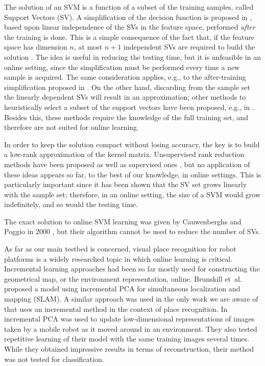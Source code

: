 The solution of an SVM is a function of a subset of the training samples,
called Support Vectors (SV).
A simplification of the decision function is proposed in
\cite{DownsGM01}, based upon linear independence of the SVs in the
feature space, performed \emph{after} the training is done. This is a
simple consequence of the fact that, if the feature space has
dimension $n$, at most $n+1$ independent SVs are required to build the
solution \cite{PontilV98}. The idea is useful in reducing the testing
time, but it is unfeasible in an online setting, since the
simplification must be performed every time a new sample is
acquired. The same consideration applies, e.g., to the after-training
simplification proposed in \cite{nguyen2005}. On the other hand,
discarding from the sample set the linearly dependent SVs will result
in an approximation; other methods to heuristically select a subset of
the support vectors have been proposed, e.g., in
\cite{LeeM01,schoel06,KeerthiCDC06}. Besides this, these methods
require the knowledge of the full training set, and therefore are not
suited for online learning.

In order to keep the solution compact without losing accuracy, the key
is to build a low-rank approximation of the kernel matrix. Unsupervised
rank reduction methods have been proposed
\cite{Baudat03} as well as supervised ones \cite{BachJordan2005}, but
no application of these ideas appears so far, to the best of our
knowledge, in online settings. This is particularly important since it
has been shown \cite{Steinwart03} that the SV set grows linearly with
the sample set; therefore, in an online setting, the size of a SVM
would grow indefinitely, and so would the testing time.

The exact solution to online SVM learning was given by Cauwenberghs
and Poggio in 2000 \cite{CauwenberghsP00}, but their algorithm cannot
be used to reduce the number of SVs.

As far as our main testbed is concerned, visual place recognition for
robot platforms is a widely researched topic in which online learning
is critical. Incremental learning approaches had been so far mostly
used for constructing the geometrical map, or the environment
representation, online.  Brunskill et~al. \cite{emma:irca05} proposed
a model using incremental PCA for simultaneous localization and
mapping (SLAM). A similar approach was used in the only work we are
aware of that uses an incremental method in the context of place
recognition. In \cite{ljubjiana:icra02} incremental PCA was used to
update low-dimensional representations of images taken by a mobile
robot as it moved around in an environment. They also tested
repetitive learning of their model with the same training images
several times. While they obtained impressive results in terms of
reconstruction, their method was not tested for classification.
